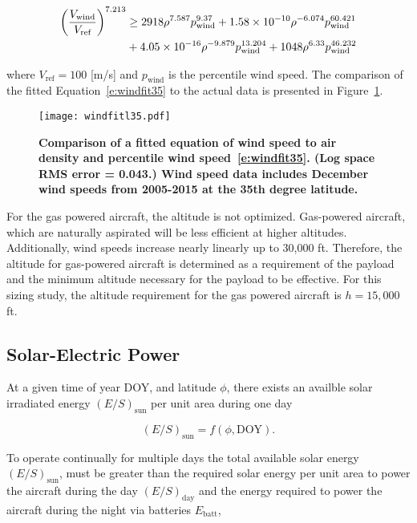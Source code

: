 \documentclass[]{aiaa-tc}%
\begin{document}
\begin{align}
    \left(\frac{V_{\text{wind}}}{V_{\text{ref}}}\right)^{7.213} &\geq 2918\rho^{7.587}p_{\text{wind}}^{9.37} + \num{1.58d-10}\rho^{-6.074}p_{\text{wind}}^{60.421} \nonumber \\
    \label{e:windfit35}
    &+ \num{4.05d-16}\rho^{-9.879}p_{\text{wind}}^{13.204} + 1048\rho^{6.33}p_{\text{wind}}^{46.232}
\end{align}

where $V_{\text{ref}} = 100$ [m/s] and $p_{\text{wind}}$ is the percentile wind speed. The comparison of the fitted Equation~\eqref{e:windfit35} to the actual data is presented in Figure~\ref{f:windfitl35}. 

\begin{figure}[H]
	\begin{center}
	\texttt{[image: windfitl35.pdf]}
    \caption{\textbf{Comparison of a fitted equation of wind speed to air density and percentile wind speed~\eqref{e:windfit35}. (Log space RMS error = 0.043.) Wind speed data includes December wind speeds from 2005-2015 at the 35th degree latitude.}}
	\label{f:windfitl35}
	\end{center}
\end{figure}

For the gas powered aircraft, the altitude is not optimized.  
Gas-powered aircraft, which are naturally aspirated will be less efficient at higher altitudes.  
Additionally, wind speeds increase nearly linearly up to 30,000 ft.  
Therefore, the altitude for gas-powered aircraft is determined as a requirement of the payload and the minimum altitude necessary for the payload to be effective.\cite{orion}
For this sizing study, the altitude requirement for the gas powered aircraft is $h=15,000$ ft.

\subsection{Solar-Electric Power}

At a given time of year DOY, and latitude $\phi$, there exists an availble solar irradiated energy $(E/S)_{\text{sun}}$ per unit area during one day

\begin{equation}
    \label{e:solarfunc}
    (E/S)_{\text{sun}} = f(\phi, \text{DOY}).
\end{equation}

To operate continually for multiple days the total available solar energy $(E/S)_{\text{sun}}$, must be greater than the required solar energy per unit area to power the aircraft during the day $(E/S)_{\text{day}}$ and the energy required to power the aircraft during the night via batteries $E_{\text{batt}}$,\cite{solartech}
\end{document}
